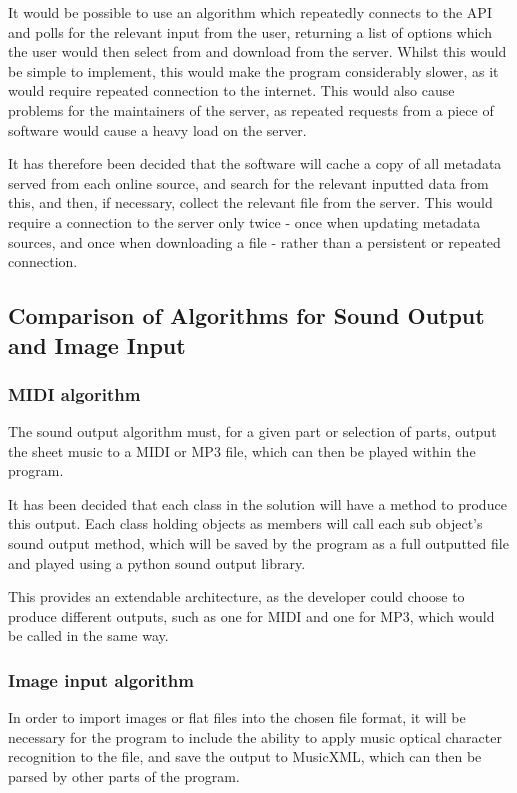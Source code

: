It would be possible to use an algorithm which repeatedly connects to the API and polls for the relevant input from the user, returning a list of options which the user would then select from and download from the server. Whilst this would be simple to implement, this would make the program considerably slower, as it would require repeated connection to the internet. This would also cause problems for the maintainers of the server, as repeated requests from a piece of software would cause a heavy load on the server.

It has therefore been decided that the software will cache a copy of all metadata served from each online source, and search for the relevant inputted data from this, and then, if necessary, collect the relevant file from the server. This would require a connection to the server only twice - once when updating metadata sources, and once when downloading a file - rather than a persistent or repeated connection.

\subsection{Comparison of Algorithms for Sound Output and Image Input}
\subsubsection{MIDI algorithm}
The sound output algorithm must, for a given part or selection of parts, output the sheet music to a MIDI or MP3 file, which can then be played within the program. 

It has been decided that each class in the solution will have a method to produce this output. Each class holding objects as members will call each sub object's sound output method, which will be saved by the program as a full outputted file and played using a python sound output library.

This provides an extendable architecture, as the developer could choose to produce different outputs, such as one for MIDI and one for MP3, which would be called in the same way.
\subsubsection{Image input algorithm}
In order to import images or flat files into the chosen file format, it will be necessary for the program to include the ability to apply music optical character recognition to the file, and save the output to MusicXML, which can then be parsed by other parts of the program. 

